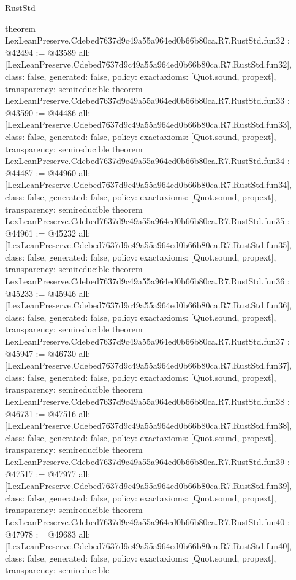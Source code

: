 \begin{lexlean}{RustStd}
\begin{coremodule}
{}
theorem LexLeanPreserve.Cdebed7637d9c49a55a964ed0b66b80ca.R7.RustStd.fun32 : @42494 := @43589 {
  all: [LexLeanPreserve.Cdebed7637d9c49a55a964ed0b66b80ca.R7.RustStd.fun32],
  class: false,
  generated: false,
  policy: exact{axioms: [Quot.sound, propext]},
  transparency: semireducible
}
theorem LexLeanPreserve.Cdebed7637d9c49a55a964ed0b66b80ca.R7.RustStd.fun33 : @43590 := @44486 {
  all: [LexLeanPreserve.Cdebed7637d9c49a55a964ed0b66b80ca.R7.RustStd.fun33],
  class: false,
  generated: false,
  policy: exact{axioms: [Quot.sound, propext]},
  transparency: semireducible
}
theorem LexLeanPreserve.Cdebed7637d9c49a55a964ed0b66b80ca.R7.RustStd.fun34 : @44487 := @44960 {
  all: [LexLeanPreserve.Cdebed7637d9c49a55a964ed0b66b80ca.R7.RustStd.fun34],
  class: false,
  generated: false,
  policy: exact{axioms: [Quot.sound, propext]},
  transparency: semireducible
}
theorem LexLeanPreserve.Cdebed7637d9c49a55a964ed0b66b80ca.R7.RustStd.fun35 : @44961 := @45232 {
  all: [LexLeanPreserve.Cdebed7637d9c49a55a964ed0b66b80ca.R7.RustStd.fun35],
  class: false,
  generated: false,
  policy: exact{axioms: [Quot.sound, propext]},
  transparency: semireducible
}
theorem LexLeanPreserve.Cdebed7637d9c49a55a964ed0b66b80ca.R7.RustStd.fun36 : @45233 := @45946 {
  all: [LexLeanPreserve.Cdebed7637d9c49a55a964ed0b66b80ca.R7.RustStd.fun36],
  class: false,
  generated: false,
  policy: exact{axioms: [Quot.sound, propext]},
  transparency: semireducible
}
theorem LexLeanPreserve.Cdebed7637d9c49a55a964ed0b66b80ca.R7.RustStd.fun37 : @45947 := @46730 {
  all: [LexLeanPreserve.Cdebed7637d9c49a55a964ed0b66b80ca.R7.RustStd.fun37],
  class: false,
  generated: false,
  policy: exact{axioms: [Quot.sound, propext]},
  transparency: semireducible
}
theorem LexLeanPreserve.Cdebed7637d9c49a55a964ed0b66b80ca.R7.RustStd.fun38 : @46731 := @47516 {
  all: [LexLeanPreserve.Cdebed7637d9c49a55a964ed0b66b80ca.R7.RustStd.fun38],
  class: false,
  generated: false,
  policy: exact{axioms: [Quot.sound, propext]},
  transparency: semireducible
}
theorem LexLeanPreserve.Cdebed7637d9c49a55a964ed0b66b80ca.R7.RustStd.fun39 : @47517 := @47977 {
  all: [LexLeanPreserve.Cdebed7637d9c49a55a964ed0b66b80ca.R7.RustStd.fun39],
  class: false,
  generated: false,
  policy: exact{axioms: [Quot.sound, propext]},
  transparency: semireducible
}
theorem LexLeanPreserve.Cdebed7637d9c49a55a964ed0b66b80ca.R7.RustStd.fun40 : @47978 := @49683 {
  all: [LexLeanPreserve.Cdebed7637d9c49a55a964ed0b66b80ca.R7.RustStd.fun40],
  class: false,
  generated: false,
  policy: exact{axioms: [Quot.sound, propext]},
  transparency: semireducible
}
\end{coremodule}
\end{lexlean}

